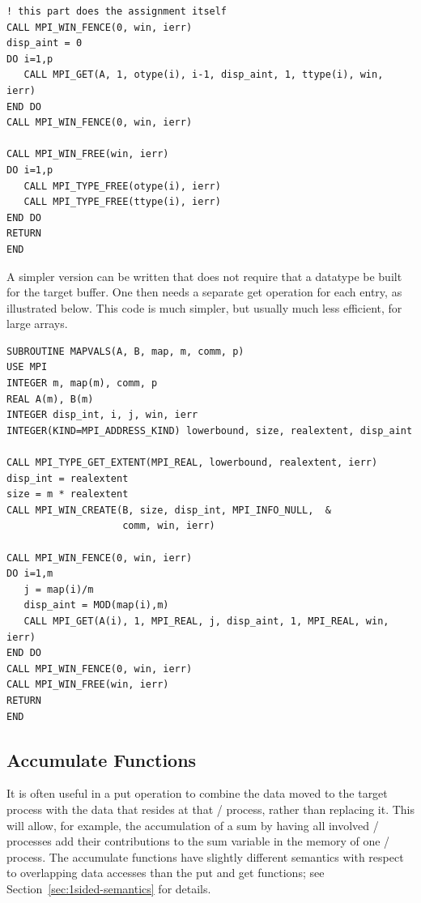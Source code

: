\begin{example}
\begin{lstlisting}[language={[MPI]Fortran},basicstyle=\lstsmall]
! this part does the assignment itself
CALL MPI_WIN_FENCE(0, win, ierr)
disp_aint = 0
DO i=1,p
   CALL MPI_GET(A, 1, otype(i), i-1, disp_aint, 1, ttype(i), win, ierr)
END DO
CALL MPI_WIN_FENCE(0, win, ierr)

CALL MPI_WIN_FREE(win, ierr)
DO i=1,p
   CALL MPI_TYPE_FREE(otype(i), ierr)
   CALL MPI_TYPE_FREE(ttype(i), ierr)
END DO
RETURN
END
\end{lstlisting}
\end{example}

\begin{example}
\label{ex:1sided-simplemap}
%
A simpler version can be written that does not require that a
datatype be built for the target buffer.  One then needs a
separate get operation for each entry,
as illustrated below.  This code is much simpler, but usually much less
efficient, for large arrays.

\begin{lstlisting}[language={[MPI]Fortran}]
SUBROUTINE MAPVALS(A, B, map, m, comm, p)
USE MPI
INTEGER m, map(m), comm, p
REAL A(m), B(m)
INTEGER disp_int, i, j, win, ierr
INTEGER(KIND=MPI_ADDRESS_KIND) lowerbound, size, realextent, disp_aint

CALL MPI_TYPE_GET_EXTENT(MPI_REAL, lowerbound, realextent, ierr)
disp_int = realextent
size = m * realextent
CALL MPI_WIN_CREATE(B, size, disp_int, MPI_INFO_NULL,  &
                    comm, win, ierr)

CALL MPI_WIN_FENCE(0, win, ierr)
DO i=1,m
   j = map(i)/m
   disp_aint = MOD(map(i),m)
   CALL MPI_GET(A(i), 1, MPI_REAL, j, disp_aint, 1, MPI_REAL, win, ierr)
END DO
CALL MPI_WIN_FENCE(0, win, ierr)
CALL MPI_WIN_FREE(win, ierr)
RETURN
END
\end{lstlisting}
\end{example}

\subsection{Accumulate Functions}
\label{sec:1sided-accumulate}

It is often useful in a put operation to combine the data moved to the
target process with the data that resides at that \mpi/ process, rather
than replacing it.
This will allow, for example, the
accumulation of
a sum by having all involved \mpi/ processes add their
contributions to the
sum variable in the memory of one \mpi/ process.
The accumulate functions have slightly different
semantics with respect to overlapping data accesses than
the put and get functions; see Section~\ref{sec:1sided-semantics}
for details.


